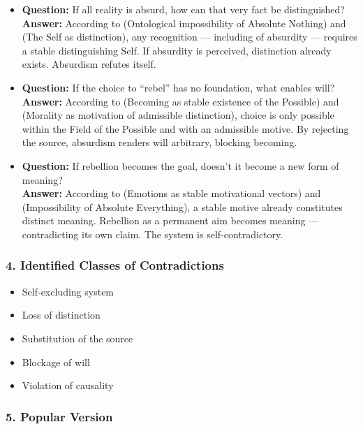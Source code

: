 \documentclass[12pt]{article}
\begin{document}
\begin{itemize}
\item \textbf{Question:} If all reality is absurd, how can that very fact be distinguished?  
\\ \textbf{Answer:} According to \text{[1]} (Ontological impossibility of Absolute Nothing) and \text{[10.5]} (The Self as distinction), any recognition — including of absurdity — requires a stable distinguishing Self. If absurdity is perceived, distinction already exists. Absurdism refutes itself.

\item \textbf{Question:} If the choice to ``rebel'' has no foundation, what enables will?  
\\ \textbf{Answer:} According to \text{[7]} (Becoming as stable existence of the Possible) and \text{[11.4]} (Morality as motivation of admissible distinction), choice is only possible within the Field of the Possible and with an admissible motive. By rejecting the source, absurdism renders will arbitrary, blocking becoming.

\item \textbf{Question:} If rebellion becomes the goal, doesn't it become a new form of meaning?  
\\ \textbf{Answer:} According to \text{[10.4]} (Emotions as stable motivational vectors) and \text{[2]} (Impossibility of Absolute Everything), a stable motive already constitutes distinct meaning. Rebellion as a permanent aim becomes meaning — contradicting its own claim. The system is self-contradictory.
\end{itemize}

\subsubsection*{4. Identified Classes of Contradictions}

\begin{itemize}
\item Self-excluding system
\item Loss of distinction
\item Substitution of the source
\item Blockage of will
\item Violation of causality
\end{itemize}

\subsubsection*{5. Popular Version}
\end{document}
